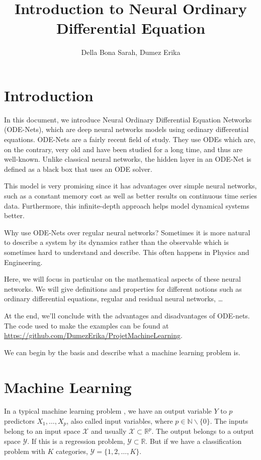 \documentclass[10pt,a4paper]{article}
\author{Della Bona Sarah, Dumez Erika}
\title{Introduction to Neural Ordinary Differential Equation}
\theoremstyle{definition}
\theoremstyle{plain}
\begin{document}
\maketitle

\newpage
\tableofcontents

\newpage
\section{Introduction}

In this document, we introduce Neural Ordinary Differential Equation Networks (ODE-Nets), which are deep neural networks models using ordinary differential equations. 
ODE-Nets are a fairly recent field of study. They use ODEs which are, on the contrary, very old and have been studied for a long time, and thus are well-known. Unlike classical neural networks, the hidden layer in an ODE-Net is defined as a black box that uses an ODE solver.

This model is very promising since it has advantages over simple neural networks, such as a constant memory cost as well as better results on continuous time series data. Furthermore, this infinite-depth approach helps model dynamical systems better.

Why use ODE-Nets over regular neural networks? Sometimes it is more natural to describe a system by its dynamics rather than the observable which is sometimes hard to understand and describe. This often happens in Physics and Engineering.

Here, we will focus in particular on the mathematical aspects of these neural networks. We will give definitions and properties for different notions such as ordinary differential equations, regular and residual neural networks, \dots

At the end, we'll conclude with the advantages and disadvantages of ODE-nets.
The code used to make the examples can be found at \url{https://github.com/DumezErika/ProjetMachineLearning}.

We can begin by the basis and describe what a machine learning problem is.

\section{Machine Learning}
In a typical machine learning problem \cite{7}, we have an output variable $Y$ to $p$ predictors $X_1,\dots, X_p$, also called input variables, where $p\in \mathbb{N}\backslash \{0\}$. The inputs belong to an input space $\mathcal{X}$ and usually $\mathcal{X} \subset \mathbb{R}^p$. The output belongs to a output space $\mathcal{Y}$. If this is a regression problem, $\mathcal{Y} \subset \mathbb{R}$. But if we have a classification problem with $K$ categories, $\mathcal{Y} = \{1,2,\dots, K\}$.
\end{document}
